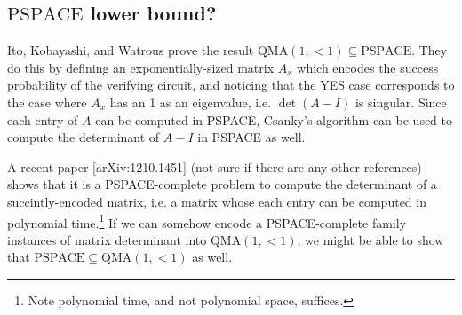\documentclass[english]{article}
\numberwithin{equation}{section}
\numberwithin{figure}{section}
\theoremstyle{plain}
\theoremstyle{definition}
\theoremstyle{plain}
\theoremstyle{definition}
\theoremstyle{remark}
\theoremstyle{remark}
\theoremstyle{plain}
\begin{document}
\subsection{$\text{PSPACE}$ lower bound?}
Ito, Kobayashi, and Watrous prove the result $\text{QMA}(1,<1)\subseteq\text{PSPACE}$. They do this by defining an exponentially-sized matrix $A_x$ which encodes the success probability of the verifying circuit, and noticing that the YES case corresponds to the case where $A_x$ has an 1 as an eigenvalue, i.e. $\det(A-I)$ is singular. Since each entry of $A$ can be computed in PSPACE, Csanky's algorithm can be used to compute the determinant of $A-I$ in PSPACE as well.

A recent paper [arXiv:1210.1451] (not sure if there are any other references) shows that it is a PSPACE-complete problem to compute the determinant of a succintly-encoded matrix, i.e. a matrix whose each entry can be computed in polynomial time.\footnote{Note polynomial time, and not polynomial space, suffices.} If we can somehow encode a PSPACE-complete family instances of matrix determinant into $\text{QMA}(1,<1)$, we might be able to show that $\text{PSPACE} \subseteq \text{QMA}(1,<1)$ as well.
\end{document}
